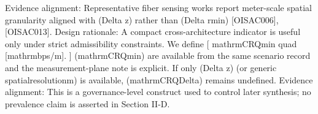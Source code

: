 {}Evidence alignment: Representative fiber sensing works report meter-scale spatial granularity aligned with (\markdownRendererBackslash{}Delta z) rather than (\markdownRendererBackslash{}Delta r\markdownRendererUnderscore{}\markdownRendererLeftBrace{}\markdownRendererBackslash{}min\markdownRendererRightBrace{}) [O\markdownRendererUnderscore{}ISAC\markdownRendererUnderscore{}006], [O\markdownRendererUnderscore{}ISAC\markdownRendererUnderscore{}013].\markdownRendererInterblockSeparator
{}
\markdownRendererSectionEnd \markdownRendererSectionBegin
{}\markdownRendererInterblockSeparator
{}Design rationale: A compact cross-architecture indicator is useful only under strict admissibility constraints.\markdownRendererParagraphSeparator
{}We define\markdownRendererSoftLineBreak
{}[\markdownRendererSoftLineBreak
{}\markdownRendererBackslash{}mathrm\markdownRendererLeftBrace{}CRQ\markdownRendererRightBrace{}\markdownRendererLeftBrace{}\markdownRendererBackslash{}min\markdownRendererRightBrace{}\markdownRendererRightBrace{} \markdownRendererBackslash{}quad [\markdownRendererBackslash{}mathrm\markdownRendererLeftBrace{}bps/m\markdownRendererRightBrace{}].\markdownRendererSoftLineBreak
{}]\markdownRendererSoftLineBreak
{}(\markdownRendererBackslash{}mathrm\markdownRendererLeftBrace{}CRQ\markdownRendererRightBrace{}\markdownRendererLeftBrace{}\markdownRendererBackslash{}min\markdownRendererRightBrace{}) are available from the same scenario record and the measurement-plane note is explicit. If only (\markdownRendererBackslash{}Delta z) (or generic spatial\markdownRendererUnderscore{}resolution\markdownRendererUnderscore{}m) is available, (\markdownRendererBackslash{}mathrm\markdownRendererLeftBrace{}CRQ\markdownRendererRightBrace{}\markdownRendererUnderscore{}\markdownRendererLeftBrace{}\markdownRendererBackslash{}Delta\markdownRendererRightBrace{}) remains undefined.\markdownRendererParagraphSeparator
{}Evidence alignment: This is a governance-level construct used to control later synthesis; no prevalence claim is asserted in Section II-D.\markdownRendererParagraphSeparator
